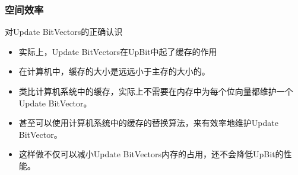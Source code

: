 \documentclass[hyperref={unicode=true}]{beamer}
\begin{document}
\begin{frame}\frametitle{空间效率}
  \begin{alertblock}{对Update BitVectors的正确认识}
    \begin{itemize}[<+->]
    \item 实际上，Update BitVectors在UpBit中起了缓存的作用
    \item 在计算机中，缓存的大小是远远小于主存的大小的。
    \item 类比计算机系统中的缓存，实际上不需要在内存中为每个位向量都维护一个Update BitVector。
    \item 甚至可以使用计算机系统中的缓存的替换算法，来有效率地维护Update BitVector。
    \item 这样做不仅可以减小Update BitVectors内存的占用，还不会降低UpBit的性能。
    \end{itemize}
  \end{alertblock}
\end{frame}
\end{document}
